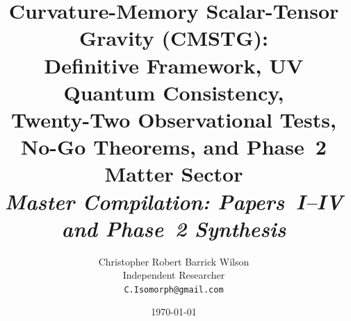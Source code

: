 \documentclass[12pt,a4paper]{article}
\begin{document}
\title{Curvature-Memory Scalar-Tensor Gravity (CMSTG):\\
Definitive Framework, UV Quantum Consistency,\\
Twenty-Two Observational Tests, No-Go Theorems, and Phase~2 Matter Sector\\[4pt]
\large\textit{Master Compilation: Papers~I--IV and Phase~2 Synthesis}}

\author{Christopher Robert Barrick Wilson\\
\small Independent Researcher\\
\small \texttt{C.Isomorph@gmail.com}}

\date{\today}

\maketitle
\end{document}
